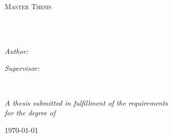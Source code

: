 \documentclass[
11pt, %
oneside, %
english, %
singlespacing, %
headsepline, %
]{MastersDoctoralThesis} %
\author{Peter Pommergård \textsc{Lind}} %
\theoremstyle{assumption}
\theoremstyle{definition}
\theoremstyle{proposition}
\begin{document}
\frontmatter %

\pagestyle{plain} %


\begin{titlepage}
\begin{center}
\vspace*{.06\textheight}
{\scshape\LARGE \univname\par}\vspace{1.5cm} %
\textsc{\Large Master Thesis}\\[0.5cm] %

\HRule \\[0.4cm] %
{\huge \bfseries \ttitle\par}\vspace{0.4cm} %
\HRule \\[1.5cm] %
 
\begin{minipage}[t]{0.4\textwidth}
\begin{flushleft} \large
\emph{Author:}\\
\href{https://www.linkedin.com/in/Peter-Pommergaard-Lind}{\authorname} %
\end{flushleft}
\end{minipage}
\begin{minipage}[t]{0.4\textwidth}
\begin{flushright} \large
\emph{Supervisor:} \\
\href{https://www.math.ku.dk/english/staff/faculty/?pure=en/persons/499763}{\supname} %
\end{flushright}
\end{minipage}\\[10.0cm]

\vfill

\large \textit{A thesis submitted in fulfillment of the requirements\\ for the degree of \degreename}\\[0.3cm] %
 
\vfill

{\large \today}\\[4cm] %
 
\vfill
\end{center}
\end{titlepage}
\end{document}
